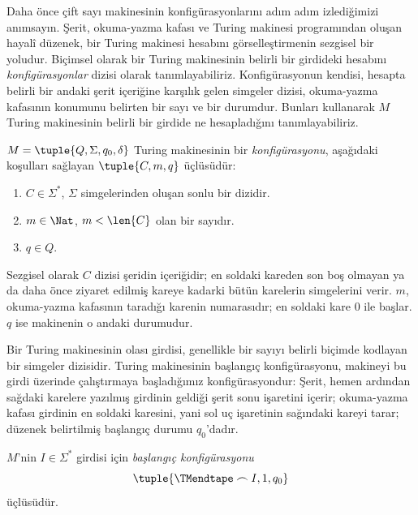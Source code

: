 \documentclass[../../../include/open-logic-section]{subfiles}
\begin{document}

\begin{explain}
Daha önce çift sayı makinesinin konfigürasyonlarını adım adım izlediğimizi
anımsayın. Şerit, okuma-yazma kafası ve Turing makinesi programından oluşan
hayalî düzenek, bir Turing makinesi hesabını görselleştirmenin sezgisel bir
yoludur. Biçimsel olarak bir Turing makinesinin belirli bir girdideki hesabını
\emph{konfigürasyonlar} dizisi olarak tanımlayabiliriz. Konfigürasyonun
kendisi, hesapta belirli bir andaki şerit içeriğine karşılık gelen simgeler
dizisi, okuma-yazma kafasının konumunu belirten bir sayı ve bir durumdur.
Bunları kullanarak $M$ Turing makinesinin belirli bir girdide ne hesapladığını
tanımlayabiliriz.
\end{explain}

\begin{defn}[Konfigürasyon]
$M=\tuple{Q,\Sigma,q_0,\delta}$ Turing makinesinin bir
\emph{konfigürasyonu}, aşağıdaki koşulları sağlayan
$\tuple{C,m,q}$ üçlüsüdür:
\begin{enumerate}
\item $C\in\Sigma^*$, $\Sigma$ simgelerinden oluşan sonlu bir dizidir.
\item $m\in\Nat$, $m<\len{C}$ olan bir sayıdır.
\item $q\in Q$.
\end{enumerate}
Sezgisel olarak $C$ dizisi şeridin içeriğidir; en soldaki kareden son boş
olmayan ya da daha önce ziyaret edilmiş kareye kadarki bütün karelerin
simgelerini verir. $m$, okuma-yazma kafasının taradığı karenin numarasıdır;
en soldaki kare $0$ ile başlar. $q$ ise makinenin o andaki durumudur.
\end{defn}

\begin{explain}
Bir Turing makinesinin olası girdisi, genellikle bir sayıyı belirli biçimde
kodlayan bir simgeler dizisidir. Turing makinesinin başlangıç konfigürasyonu,
makineyi bu girdi üzerinde çalıştırmaya başladığımız konfigürasyondur: Şerit,
hemen ardından sağdaki karelere yazılmış girdinin geldiği şerit sonu işaretini
içerir; okuma-yazma kafası girdinin en soldaki karesini, yani sol uç
işaretinin sağındaki kareyi tarar; düzenek belirtilmiş başlangıç durumu
$q_0$'dadır.
\end{explain}

\begin{defn}
$M$'nin $I\in\Sigma^*$ girdisi için \emph{başlangıç konfigürasyonu}
\[
  \tuple{\TMendtape\frown I,1,q_0}
\]
üçlüsüdür.
\end{defn}
\end{document}
